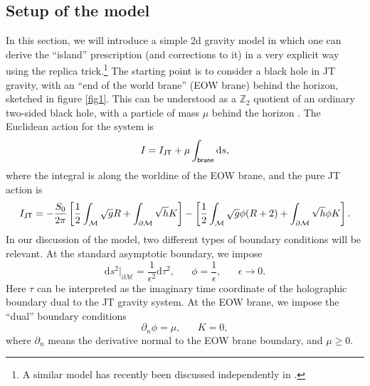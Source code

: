 \documentclass[12pt]{article}
\newcommand{\be}{\begin{equation}}
\newcommand{\ee}{\end{equation}}
\numberwithin{equation}{section}
\begin{document}
\subsection{Setup of the model}
In this section, we will introduce a simple 2d gravity model in which one can derive the ``island'' prescription (and corrections to it) in a very explicit way using the replica trick.\footnote{A similar model has recently been  discussed independently in \cite{Rozali:2019day}.} The starting point is to consider a black hole in JT gravity, with an ``end of the world brane'' (EOW brane) behind the horizon, sketched in figure \ref{fig1}. This can be understood as a $\mathbb{Z}_2$ quotient of an ordinary two-sided black hole, with a particle of mass $\mu$ behind the horizon \cite{Kourkoulou:2017zaj}. The Euclidean action for the system is
\be
 I = I_{\sf{JT}} +  \mu\int_{\sf{brane}}  \mathrm{d}s,
\ee
where the integral is along the worldine of the EOW brane, and the pure JT action is
\be\label{eq:JTaction2}
I_{\sf{JT}} = -\frac{S_0}{2\pi}\left[\frac{1}{2}\int_{\mathcal{M}}\sqrt{g}R + \int_{\partial\mathcal{M}}\sqrt{h}K\right] -\left[ \frac{1}{2}\int_{\mathcal{M}}\sqrt{g}\phi(R+2) +\int_{\partial\mathcal{M}}\sqrt{h}\phi K\right].
\ee
In our discussion of the model, two different types of boundary conditions will be relevant. At the standard asymptotic boundary, we impose
\be
\mathrm{d}s^2|_{\partial\mathcal{M}} = \frac{1}{\epsilon^2}\mathrm{d}\tau^2, \hspace{20pt} \phi = \frac{1}{\epsilon}, \hspace{20pt} \epsilon \rightarrow 0.\label{bc1}
\ee
Here $\tau$ can be interpreted as the imaginary time coordinate of the holographic boundary dual to the JT gravity system. At the EOW brane, we impose the ``dual'' boundary conditions
\be
\partial_n\phi = \mu, \hspace{20pt} K = 0,\label{bc2}
\ee
where $\partial_n$ means the derivative normal to the EOW brane boundary, and $\mu\ge 0$.
\end{document}
